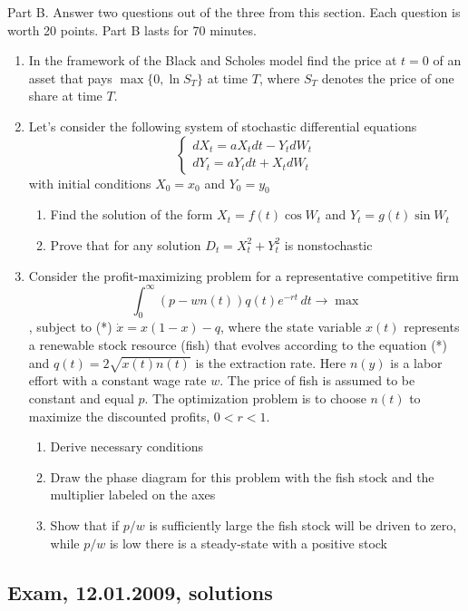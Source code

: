 \documentclass[pdftex,12pt,a4paper]{article}
\begin{document}
Part B.
Answer two questions out of the three from this section. Each question is worth 20 points.
Part B lasts for 70 minutes.
\begin{enumerate}[resume]
\item  In the framework of the Black and Scholes model find the price at $t=0$ of an asset that pays $\max\{0,\ln S_T\}$  at time $T$, where $S_T$ denotes the price of one share at time $T$.

\item Let’s consider the following system of stochastic differential equations
\[
\left\{
  \begin{array}{l}
    dX_t=aX_t dt-Y_t dW_t \\
    dY_t=aY_t dt+X_t dW_t
  \end{array}
\right.
\]
with initial conditions $X_0=x_0$ and $Y_0=y_0$ 
\begin{enumerate}
\item Find the solution of the form $X_t=f(t)\cos W_t$ and $Y_t=g(t)\sin W_t$ 
\item Prove that for any solution $D_t=X_t^2+Y_t^2$ is nonstochastic
\end{enumerate}


\item Consider the profit-maximizing problem for a representative competitive firm 
\[
\int_0^{\infty} (p-wn(t))q(t)e^{-rt}\, dt \to \max
\]
, subject to (*) $\dot{x}=x(1-x)-q$, where the state variable $x(t)$ represents a renewable stock resource (fish) that evolves according to the equation (*) and $q(t)=2\sqrt{x(t)n(t)}$ is the extraction rate. Here $n(y)$ is a labor effort with a constant wage rate $w$. The price of fish is assumed to be constant and equal $p$.  The optimization problem is to choose $n(t)$ to maximize the discounted profits, $0<r<1$.
\begin{enumerate}
\item Derive necessary conditions
\item Draw the phase diagram for this problem with the fish stock and the multiplier labeled on the axes
\item Show that if $p/w$ is sufficiently large the fish stock will be driven to zero, while $p/w$ is low there is a steady-state with a positive stock
\end{enumerate}
\end{enumerate}

\subsection{Exam, 12.01.2009, solutions}
\end{document}
